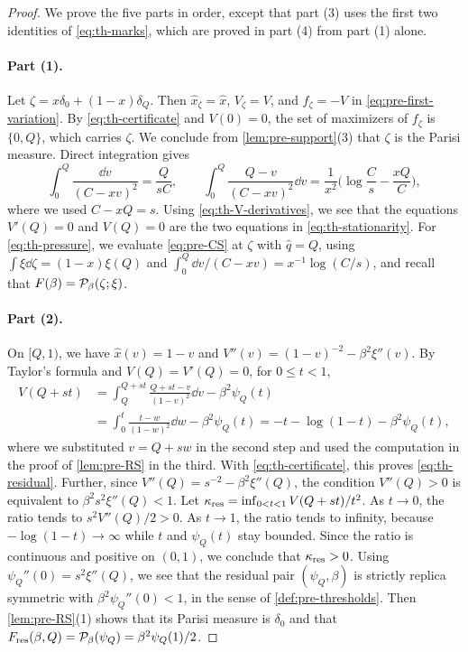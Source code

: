 \begin{proof}
We prove the five parts in order, except that part (3) uses the first two identities of \eqref{eq:th-marks}, which are proved in part (4) from part (1) alone.

\paragraph{Part (1).}
Let $\zeta=x\delta_0+(1-x)\delta_Q$. Then $\hat x_\zeta=\hat x$, $V_\zeta=V$, and $f_\zeta=-V$ in \eqref{eq:pre-first-variation}. By \eqref{eq:th-certificate} and $V(0)=0$, the set of maximizers of $f_\zeta$ is $\{0,Q\}$, which carries $\zeta$. We conclude from \cref{lem:pre-support}(3) that $\zeta$ is the Parisi measure. Direct integration gives
\[
\int_0^Q\frac{\dd v}{(C-xv)^2}=\frac Q{sC},\qquad\int_0^Q\frac{Q-v}{(C-xv)^2}\dd v=\frac1{x^2}\Big(\log\frac Cs-\frac{xQ}C\Big),
\]
where we used $C-xQ=s$. Using \eqref{eq:th-V-derivatives}, we see that the equations $V'(Q)=0$ and $V(Q)=0$ are the two equations in \eqref{eq:th-stationarity}. For \eqref{eq:th-pressure}, we evaluate \eqref{eq:pre-CS} at $\zeta$ with $\hat q=Q$, using $\int\xi\dd\zeta=(1-x)\xi(Q)$ and $\int_0^Q\dd v/(C-xv)=x^{-1}\log(C/s)$, and recall that $F(\beta)=\mathcal P_\beta(\zeta;\xi)$.

\paragraph{Part (2).}
On $[Q,1)$, we have $\hat x(v)=1-v$ and $V''(v)=(1-v)^{-2}-\beta^2\xi''(v)$. By Taylor's formula and $V(Q)=V'(Q)=0$, for $0\le t<1$,
\[
\begin{split}
V(Q+st)&=\int_Q^{Q+st}\frac{Q+st-v}{(1-v)^2}\dd v-\beta^2\psi_Q(t)\\
&=\int_0^t\frac{t-w}{(1-w)^2}\dd w-\beta^2\psi_Q(t)=-t-\log(1-t)-\beta^2\psi_Q(t),
\end{split}
\]
where we substituted $v=Q+sw$ in the second step and used the computation in the proof of \cref{lem:pre-RS} in the third. With \eqref{eq:th-certificate}, this proves \eqref{eq:th-residual}. Further, since $V''(Q)=s^{-2}-\beta^2\xi''(Q)$, the condition $V''(Q)>0$ is equivalent to $\beta^2s^2\xi''(Q)<1$. Let $\kappa_{\rm res}=\inf_{0<t<1}V(Q+st)/t^2$. As $t\to0$, the ratio tends to $s^2V''(Q)/2>0$. As $t\to1$, the ratio tends to infinity, because $-\log(1-t)\to\infty$ while $t$ and $\psi_Q(t)$ stay bounded. Since the ratio is continuous and positive on $(0,1)$, we conclude that $\kappa_{\rm res}>0$. Using $\psi_Q''(0)=s^2\xi''(Q)$, we see that the residual pair $(\psi_Q,\beta)$ is strictly replica symmetric with $\beta^2\psi_Q''(0)<1$, in the sense of \cref{def:pre-thresholds}. Then \cref{lem:pre-RS}(1) shows that its Parisi measure is $\delta_0$ and that $F_{\rm res}(\beta,Q)=\mathcal P_\beta(\psi_Q)=\beta^2\psi_Q(1)/2$.


\end{proof}
